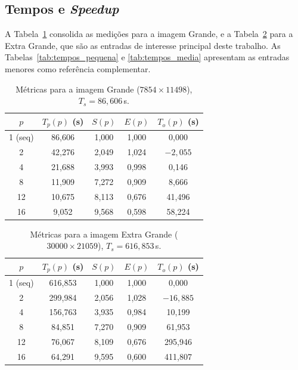 \documentclass[12pt]{article}
\begin{document}
\subsection{Tempos e \textit{Speedup}}

A Tabela~\ref{tab:tempos_grande} consolida as medições para a imagem Grande, e a Tabela~\ref{tab:tempos_extra} para a Extra Grande, que são as entradas de interesse principal deste trabalho. As Tabelas~\ref{tab:tempos_pequena} e \ref{tab:tempos_media} apresentam as entradas menores como referência complementar.

\begin{table}[ht]
	\centering
	\caption{Métricas para a imagem Grande ($7854 \times 11498$), $T_s = 86{,}606$\,s.}
	\label{tab:tempos_grande}
	\begin{tabular}{ccccc}
		\toprule
		$p$     & $T_p(p)$ (s) & $S(p)$ & $E(p)$ & $T_o(p)$ (s) \\
		\midrule
		1 (seq) & 86,606       & 1,000  & 1,000  & 0,000        \\
		2       & 42,276       & 2,049  & 1,024  & $-2,055$     \\
		4       & 21,688       & 3,993  & 0,998  & 0,146        \\
		8       & 11,909       & 7,272  & 0,909  & 8,666        \\
		12      & 10,675       & 8,113  & 0,676  & 41,496       \\
		16      & 9,052        & 9,568  & 0,598  & 58,224       \\
		\bottomrule
	\end{tabular}
\end{table}

\begin{table}[ht]
	\centering
	\caption{Métricas para a imagem Extra Grande ($30000 \times 21059$), $T_s = 616{,}853$\,s.}
	\label{tab:tempos_extra}
	\begin{tabular}{ccccc}
		\toprule
		$p$     & $T_p(p)$ (s) & $S(p)$ & $E(p)$ & $T_o(p)$ (s) \\
		\midrule
		1 (seq) & 616,853      & 1,000  & 1,000  & 0,000        \\
		2       & 299,984      & 2,056  & 1,028  & $-16,885$    \\
		4       & 156,763      & 3,935  & 0,984  & 10,199       \\
		8       & 84,851       & 7,270  & 0,909  & 61,953       \\
		12      & 76,067       & 8,109  & 0,676  & 295,946      \\
		16      & 64,291       & 9,595  & 0,600  & 411,807      \\
		\bottomrule
	\end{tabular}
\end{table}
\end{document}
